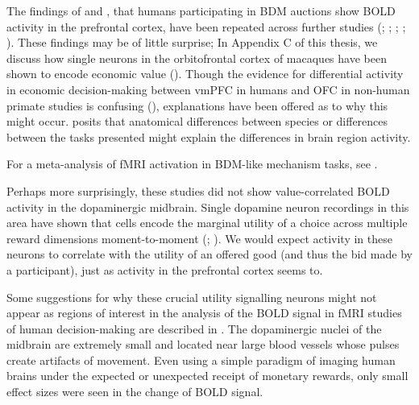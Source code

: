 The findings of \cite{gretherMentalProcessesStrategic2007} and \cite{medicDopamineModulatesNeural2014}, that humans participating in BDM auctions show BOLD activity in the prefrontal cortex, have been repeated across further studies (\cite{chibEvidenceCommonRepresentation2009}; \cite{demartinoNeurobiologyReferenceDependentValue2009}; \cite{hareDissociatingRoleOrbitofrontal2008}; \cite{plassmannAppetitiveAversiveGoal2010}; \cite{zangemeisterNeuralActivityHuman2019}). These findings may be of little surprise; In Appendix C of this thesis, we discuss how single neurons in the orbitofrontal cortex of macaques have been shown to encode economic value (\cite{padoaschioppaNeuronsOrbitofrontalCortex2006}). Though the evidence for differential activity in economic decision-making between vmPFC in humans and OFC in non-human primate studies is confusing (\cite{padoaschioppaOrbitofrontalCortexNeural2017}), explanations have been offered as to why this might occur. \cite{wallisCrossspeciesStudiesOrbitofrontal2012} posits that anatomical differences between species or differences between the tasks presented might explain the differences in brain region activity.

For a meta-analysis of fMRI activation in BDM-like mechanism tasks, see \cite{newtonfennerEconomicValueBrain2023}.

Perhaps more surprisingly, these studies did not show value-correlated BOLD activity in the dopaminergic midbrain. Single dopamine neuron recordings in this area have shown that cells encode the marginal utility of a choice across multiple reward dimensions moment-to-moment (\cite{lakDopaminePredictionError2014}; \cite{staufferDopamineRewardPrediction2014}). We would expect activity in these neurons to correlate with the utility of an offered good (and thus the bid made by a participant), just as activity in the prefrontal cortex seems to.

Some suggestions for why these crucial utility signalling neurons might not appear as regions of interest in the analysis of the BOLD signal in fMRI studies of human decision-making are described in \cite{dardenneBOLDResponsesReflecting2008}. The dopaminergic nuclei of the midbrain are extremely small and located near large blood vessels whose pulses create artifacts of movement. Even using a simple paradigm of imaging human brains under the expected or unexpected receipt of monetary rewards, only small effect sizes were seen in the change of BOLD signal. 

